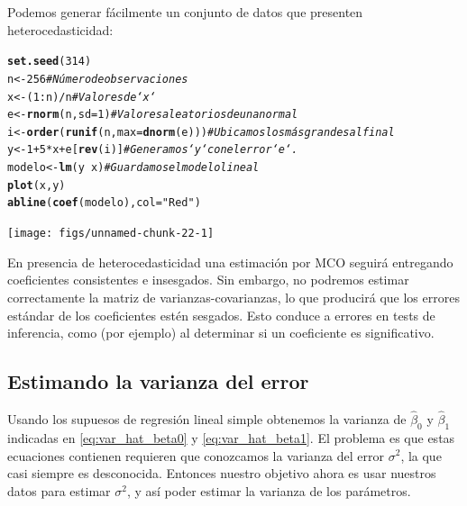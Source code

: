 \documentclass[12pt]{report}\usepackage[]{graphicx}\usepackage[]{color}
\makeatletter
\newcommand{\hlnum}[1]{\textcolor[rgb]{0.686,0.059,0.569}{#1}}%
\newcommand{\hlstr}[1]{\textcolor[rgb]{0.192,0.494,0.8}{#1}}%
\newcommand{\hlcom}[1]{\textcolor[rgb]{0.678,0.584,0.686}{\textit{#1}}}%
\newcommand{\hlopt}[1]{\textcolor[rgb]{0,0,0}{#1}}%
\newcommand{\hlstd}[1]{\textcolor[rgb]{0.345,0.345,0.345}{#1}}%
\newcommand{\hlkwb}[1]{\textcolor[rgb]{0.69,0.353,0.396}{#1}}%
\newcommand{\hlkwc}[1]{\textcolor[rgb]{0.333,0.667,0.333}{#1}}%
\newcommand{\hlkwd}[1]{\textcolor[rgb]{0.737,0.353,0.396}{\textbf{#1}}}%
\newenvironment{kframe}{%
 \def\at@end@of@kframe{}%
 \ifinner\ifhmode%
  \def\at@end@of@kframe{\end{minipage}}%
  \begin{minipage}{\columnwidth}%
 \fi\fi%
 \def\FrameCommand##1{\hskip\@totalleftmargin \hskip-\fboxsep
 \colorbox{shadecolor}{##1}\hskip-\fboxsep
     \hskip-\linewidth \hskip-\@totalleftmargin \hskip\columnwidth}%
 \MakeFramed {\advance\hsize-\width
   \@totalleftmargin\z@ \linewidth\hsize
   \@setminipage}}%
 {\par\unskip\endMakeFramed%
 \at@end@of@kframe}
\newenvironment{knitrout}{}{} %
\makeatother
\begin{document}
Podemos generar fácilmente un conjunto de datos que presenten heterocedasticidad:

\begin{knitrout}
\color{fgcolor}\begin{kframe}
\begin{alltt}
\hlkwd{set.seed}\hlstd{(}\hlnum{314}\hlstd{)}
\hlstd{n} \hlkwb{<-} \hlnum{256}                           \hlcom{# Número de observaciones}
\hlstd{x} \hlkwb{<-} \hlstd{(}\hlnum{1}\hlopt{:}\hlstd{n)}\hlopt{/}\hlstd{n}                       \hlcom{# Valores de `x`}
\hlstd{e} \hlkwb{<-} \hlkwd{rnorm}\hlstd{(n,} \hlkwc{sd}\hlstd{=}\hlnum{1}\hlstd{)}                \hlcom{# Valores aleatorios de una normal}
\hlstd{i} \hlkwb{<-} \hlkwd{order}\hlstd{(}\hlkwd{runif}\hlstd{(n,} \hlkwc{max}\hlstd{=}\hlkwd{dnorm}\hlstd{(e)))} \hlcom{# Ubicamos los más grandes al final}
\hlstd{y} \hlkwb{<-} \hlnum{1} \hlopt{+} \hlnum{5} \hlopt{*} \hlstd{x} \hlopt{+} \hlstd{e[}\hlkwd{rev}\hlstd{(i)]}         \hlcom{# Generamos `y` con el error `e`.}
\hlstd{modelo} \hlkwb{<-} \hlkwd{lm}\hlstd{(y} \hlopt{~} \hlstd{x)}                \hlcom{# Guardamos el modelo lineal}
\hlkwd{plot}\hlstd{(x, y)}
\hlkwd{abline}\hlstd{(}\hlkwd{coef}\hlstd{(modelo),} \hlkwc{col} \hlstd{=} \hlstr{"Red"}\hlstd{)}
\end{alltt}
\end{kframe}

{\centering \texttt{[image: figs/unnamed-chunk-22-1]} 

}



\end{knitrout}

En presencia de heterocedasticidad una estimación por MCO seguirá entregando coeficientes consistentes e insesgados. Sin embargo, no podremos estimar correctamente la matriz de varianzas-covarianzas, lo que producirá que los errores estándar de los coeficientes estén sesgados. Esto conduce a errores en tests de inferencia, como (por ejemplo) al determinar si un coeficiente es significativo.

\subsection{Estimando la varianza del error}

Usando los supuesos de regresión lineal simple obtenemos la varianza de $\hat\beta_0$ y $\hat\beta_1$ indicadas en \eqref{eq:var_hat_beta0} y \eqref{eq:var_hat_beta1}.
El problema es que estas ecuaciones contienen requieren que conozcamos la varianza del error $\sigma^2$, la que casi siempre es desconocida.
Entonces nuestro objetivo ahora es usar nuestros datos para estimar $\sigma^2$, y así poder estimar la varianza de los parámetros.
\end{document}
